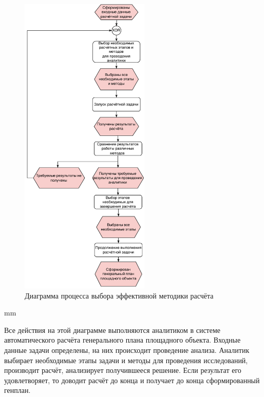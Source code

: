 \begin{figure}[H]
	\hspace*{-2.5 cm}\includegraphics[width=0.55\textwidth, left]{analysis/pictures/usecases/analytics_epc}
	\caption{Диаграмма процесса выбора эффективной методики расчёта}
	\label{pic:analysis__usecases-analytics-epc}
\end{figure}
 mm

Все действия на этой диаграмме выполняются аналитиком в системе автоматического
расчёта генерального плана площадного объекта.
Входные данные задачи определены, на них происходит проведение анализа.
Аналитик выбирает необходимые этапы задачи и методы для проведения исследований, производит расчёт,
анализирует получившееся решение. Если результат его удовлетворяет, то доводит расчёт до конца
и получает до конца сформированный генплан.